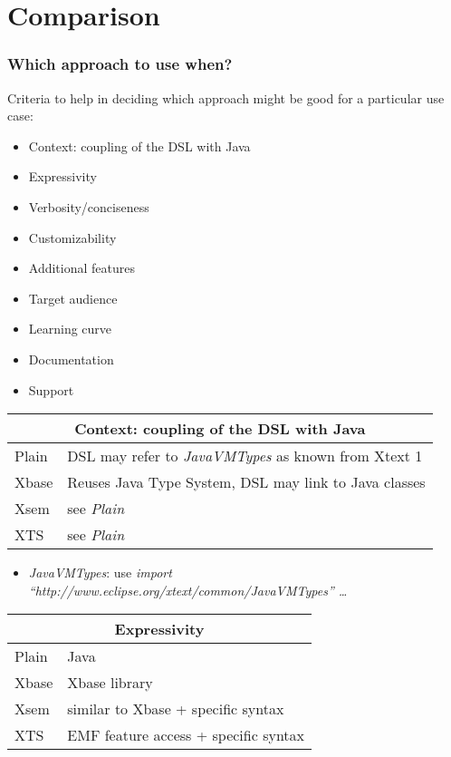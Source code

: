 \section{Comparison}

\begin{frame}
  \frametitle{Which approach to use when?}
  
  Criteria to help in deciding which approach might be good for a particular use
  case:
  \begin{itemize}
    \item Context: coupling of the DSL with Java
    \item Expressivity
    \item Verbosity/conciseness
    \item Customizability
    \item Additional features
    \item Target audience
    \item Learning curve
    \item Documentation
    \item Support
  \end{itemize}

\framebreak  
\begin{tabularx}{\linewidth}{ l   X }
\multicolumn{2}{c}{Context: coupling of the DSL with Java} \\ \hline
Plain & DSL may refer to \emph{JavaVMTypes} as known from Xtext 1\\
Xbase & Reuses Java Type System, DSL may link to Java classes \\
Xsem & see \emph{Plain} \\
XTS & see \emph{Plain} \\
\end{tabularx}
\begin{itemize}
  \item \emph{JavaVMTypes}: use \emph{import
  ``http://\-www.eclipse.org/\-xtext/\-common/\-JavaVMTypes'' \ldots}
\end{itemize}

\framebreak
\begin{tabularx}{\linewidth}{ l   X }
\multicolumn{2}{c}{Expressivity} \\ \hline
Plain & Java \\
Xbase & Xbase library \\
Xsem & similar to Xbase + specific syntax\\
XTS & EMF feature access + specific syntax\\
\end{tabularx}


\end{frame}
